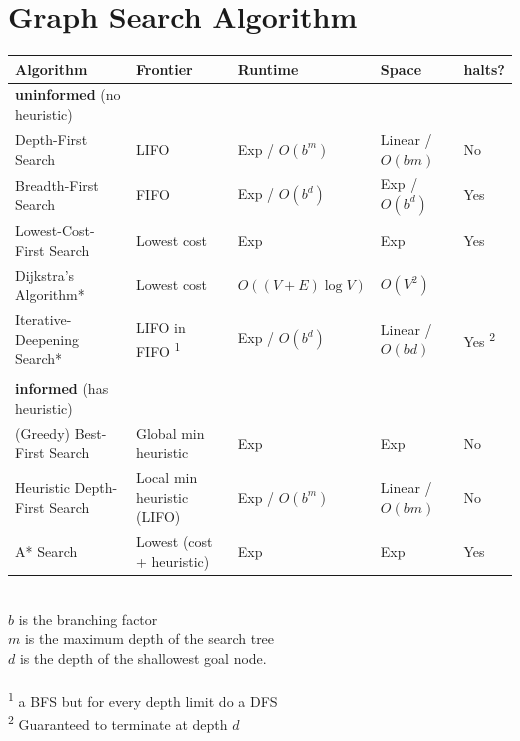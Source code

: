 \documentclass{article}
\theoremstyle{note}
\begin{document}

\section{Graph Search Algorithm}

\begin{table}[h!]
\begin{tabular}{@{}lllll@{}}
\toprule
\textbf{Algorithm} & \textbf{Frontier} & \textbf{Runtime} & \textbf{Space} & \textbf{halts?}\\ \midrule
\textbf{uninformed} (no heuristic)\\
Depth-First Search & LIFO & Exp / $O(b^m)$ & Linear / $O(bm)$ & No\\
Breadth-First Search & FIFO & Exp / $O(b^{d})$ & Exp / $O(b^{d})$ & Yes\\
Lowest-Cost-First Search & Lowest cost & Exp & Exp & Yes\\
Dijkstra's Algorithm* & Lowest cost & $O((V+E) \log V)$ & $O(V^2)$ \\
Iterative-Deepening Search* & LIFO in FIFO \textsuperscript{1} & Exp / $O(b^{d})$ & Linear / $O(bd)$ & Yes \textsuperscript{2}\\\\

\textbf{informed} (has heuristic)\\
(Greedy) Best-First Search & Global min heuristic & Exp & Exp & No \\
Heuristic Depth-First Search &  Local min heuristic (LIFO) &  Exp / $O(b^m)$ & Linear / $O(bm)$  & No\\
A* Search & Lowest (cost + heuristic) & Exp & Exp & Yes\\ \bottomrule
\end{tabular}
\footnotesize{\\ $b$ is the branching factor \\ $m$ is the maximum depth of the search tree \\ $d$ is the depth of the shallowest goal node.}\\\\
\footnotesize{\textsuperscript{1} a BFS but for every depth limit do a DFS} \\
\footnotesize{\textsuperscript{2} Guaranteed to terminate at depth $d$}
\end{table}
\end{document}
